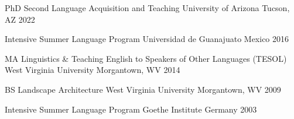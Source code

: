 



\begin{cvhonors}

\cvhonor
{PhD Second Language Acquisition and Teaching} %
{University of Arizona} %
{Tucson, AZ} %
{2022} %

\cvhonor
{Intensive Summer Language Program} %
{Universidad de Guanajuato} %
{Mexico} %
{2016} %

\cvhonor
{MA Linguistics \& Teaching English to Speakers of Other Languages (TESOL)} %
{West Virginia University} %
{Morgantown, WV} %
{2014} %

\cvhonor
{BS Landscape Architecture} %
{West Virginia University} %
{Morgantown, WV} %
{2009} %

\cvhonor
{Intensive Summer Language Program} %
{Goethe Institute} %
{Germany} %
{2003} %


\end{cvhonors}



